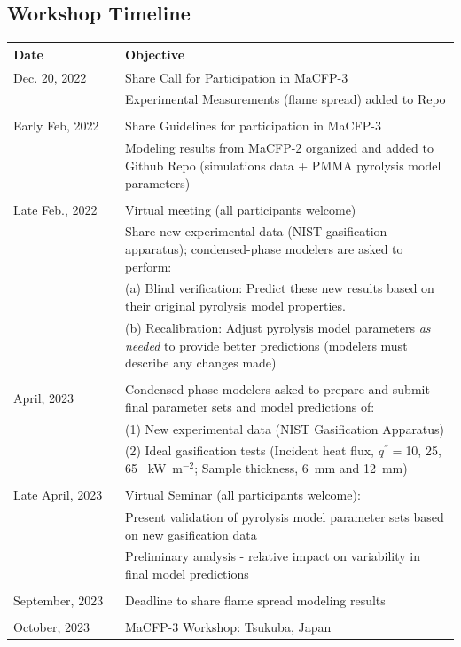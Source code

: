 \documentclass[12pt]{article}
\begin{document}
\subsection{Workshop Timeline}
\label{Timeline}
\begin{table}[htb]
\begin{tabular}{p{0.25\linewidth} | p{0.75\linewidth}}
\hline
\textbf{Date}       	& \textbf{Objective} \\
\hline
Dec. 20, 2022	& Share Call for Participation in MaCFP-3\\
& Experimental Measurements (flame spread) added to Repo\\ 
\\
Early Feb, 2022    	& Share Guidelines for participation in MaCFP-3 \\
& Modeling results from MaCFP-2 organized and added to Github Repo (simulations data + PMMA pyrolysis model parameters)\\ 
\\
Late Feb., 2022  	& Virtual meeting (all participants welcome)\\
&Share new experimental data (NIST gasification apparatus); condensed-phase modelers are asked to perform:\\ 
&(a) Blind verification: Predict these new results based on their original pyrolysis model properties. \\ 
&(b) Recalibration: Adjust pyrolysis model parameters \textit{as needed} to provide better predictions (modelers must describe any changes made)\\ 
\\
April, 2023  &Condensed-phase modelers asked to prepare and submit final parameter sets and model predictions of: \\
&{ }(1) New experimental data (NIST Gasification Apparatus)\\    
&{ }(2) Ideal gasification tests (Incident heat flux, $q^{''}=$10, 25, 65 ~kW~m$^{-2}$; Sample thickness, 6~mm and 12~mm)\\
\\
Late April, 2023           	& Virtual Seminar (all participants welcome):\\ 
&Present validation of pyrolysis model parameter sets based on new gasification data \\ 
&Preliminary analysis - relative impact on variability in final model predictions\\
\\
September, 2023 	& Deadline to share flame spread modeling results \\ {}\\
October, 2023   	& MaCFP-3 Workshop: Tsukuba, Japan \\
\hline
\end{tabular}
\end{table}
\end{document}
